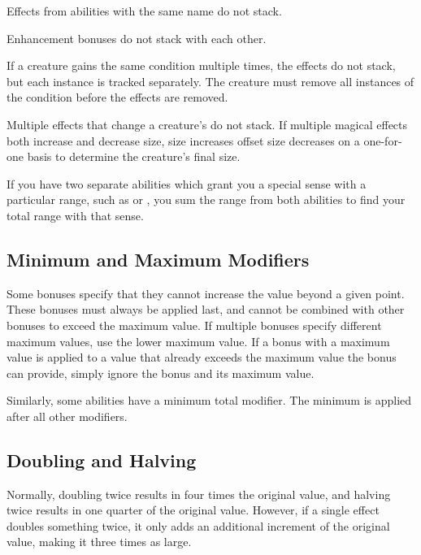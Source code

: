     \begin{raggeditemize}
      \item Effects from abilities with the same name do not stack.
      \item Enhancement bonuses do not stack with each other.
      \item If a creature gains the same condition multiple times, the effects do not stack, but each instance is tracked separately.
        The creature must remove all instances of the condition before the effects are removed.
      \item Multiple \magical effects that change a creature's  do not stack.
        If multiple magical effects both increase and decrease size, size increases offset size decreases on a one-for-one basis to determine the creature's final size.
      \item If you have two separate abilities which grant you a special sense with a particular range, such as  or , you sum the range from both abilities to find your total range with that sense.
    \end{raggeditemize}

  \subsection{Minimum and Maximum Modifiers}\label{Minimum and Maximum Modifiers}
    Some bonuses specify that they cannot increase the value beyond a given point.
    These bonuses must always be applied last, and cannot be combined with other bonuses to exceed the maximum value.
    If multiple bonuses specify different maximum values, use the lower maximum value.
    If a bonus with a maximum value is applied to a value that already exceeds the maximum value the bonus can provide, simply ignore the bonus and its maximum value.

    Similarly, some abilities have a minimum total modifier.
    The minimum is applied after all other modifiers.

  \subsection{Doubling and Halving}\label{Doubling and Halving}
    Normally, doubling twice results in four times the original value, and halving twice results in one quarter of the original value.
    However, if a single effect doubles something twice, it only adds an additional increment of the original value, making it three times as large.

